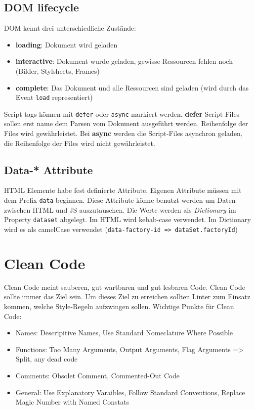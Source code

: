 \documentclass[11pt,twoside,landscape]{article}
\begin{document}
\begin{multicols}{4}
\subsection{DOM lifecycle}
\label{sec:orgff38398}
DOM kennt drei unterschiedliche Zustände: 
\begin{itemize}
\item \textbf{loading}: Dokument wird geladen
\item \textbf{interactive}: Dokument wurde geladen, gewisse Ressourcen fehlen noch (Bilder, Stylsheets, Frames)
\item \textbf{complete}: Das Dokument und alle Ressourcen sind geladen (wird durch das Event \texttt{load} representiert)
\end{itemize}

Script tags können mit \texttt{defer} oder \texttt{async} markiert werden. \textbf{defer} Script Files sollen erst name dem Parsen vom Dokument ausgeführt werden. Reihenfolge der Files wird gewährleistet. Bei \textbf{async} werden die Script-Files asynchron geladen, die Reihenfolge der Files wird nicht gewährleistet.

\subsection{Data-* Attribute}
\label{sec:org38ed142}
HTML Elemente habe fest definierte Attribute. Eigenen Attribute müssen mit dem Prefix \texttt{data} beginnen. Diese Attribute könne benutzt werden um Daten zwischen HTML und JS auszutauschen. Die Werte werden als \emph{Dictionary} im Property \texttt{dataset} abgelegt. Im HTML wird kebab-case verwendet. Im Dictionary wird es als camelCase verwendet (\texttt{data-factory-id => dataSet.factoryId})

\section{Clean Code}
\label{sec:orga36b78d}
Clean Code meint sauberen, gut wartbaren und gut lesbaren Code. Clean Code sollte immer das Ziel sein. Um dieses Ziel zu erreichen sollten Linter zum Einsatz kommen, welche Style-Regeln aufzwingen sollen. 
Wichtige Punkte für Clean Code:
\begin{itemize}
\item Names: Descripitive Names, Use Standard Nomeclature Where Possible
\item Functions: Too Many Arguments, Output Arguments, Flag Arguments => Split, any dead code
\item Comments: Obsolet Comment, Commented-Out Code
\item General: Use Explanatory Varaibles, Follow Standard Conventions, Replace Magic Number with Named Constats
\end{itemize}


\end{multicols}
\end{document}
